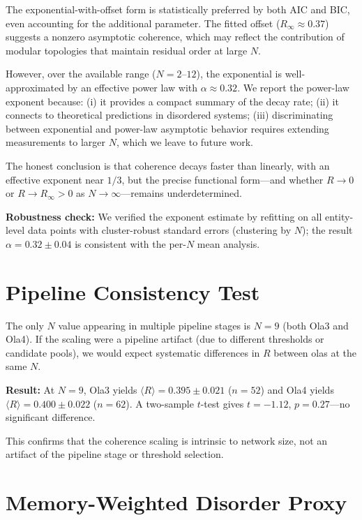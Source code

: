 \documentclass[reprint,aps,prb,superscriptaddress,floatfix]{revtex4-2}
\begin{document}
The exponential-with-offset form is statistically preferred by both AIC and BIC, even accounting for the additional parameter. The fitted offset ($R_\infty \approx 0.37$) suggests a nonzero asymptotic coherence, which may reflect the contribution of modular topologies that maintain residual order at large $N$.

However, over the available range ($N = 2$--$12$), the exponential is well-approximated by an effective power law with $\alpha \approx 0.32$. We report the power-law exponent because: (i) it provides a compact summary of the decay rate; (ii) it connects to theoretical predictions in disordered systems; (iii) discriminating between exponential and power-law asymptotic behavior requires extending measurements to larger $N$, which we leave to future work.

The honest conclusion is that coherence decays faster than linearly, with an effective exponent near $1/3$, but the precise functional form---and whether $R \to 0$ or $R \to R_\infty > 0$ as $N \to \infty$---remains underdetermined.

\textbf{Robustness check:} We verified the exponent estimate by refitting on all entity-level data points with cluster-robust standard errors (clustering by $N$); the result $\alpha = 0.32 \pm 0.04$ is consistent with the per-$N$ mean analysis.

\section{Pipeline Consistency Test}
\label{app:pipeline_test}

The only $N$ value appearing in multiple pipeline stages is $N = 9$ (both Ola3 and Ola4). If the scaling were a pipeline artifact (due to different thresholds or candidate pools), we would expect systematic differences in $R$ between olas at the same $N$.

\textbf{Result:} At $N = 9$, Ola3 yields $\langle R \rangle = 0.395 \pm 0.021$ ($n = 52$) and Ola4 yields $\langle R \rangle = 0.400 \pm 0.022$ ($n = 62$). A two-sample $t$-test gives $t = -1.12$, $p = 0.27$---no significant difference.

This confirms that the coherence scaling is intrinsic to network size, not an artifact of the pipeline stage or threshold selection.

\section{Memory-Weighted Disorder Proxy}
\label{app:disorder_proxy}
\end{document}
